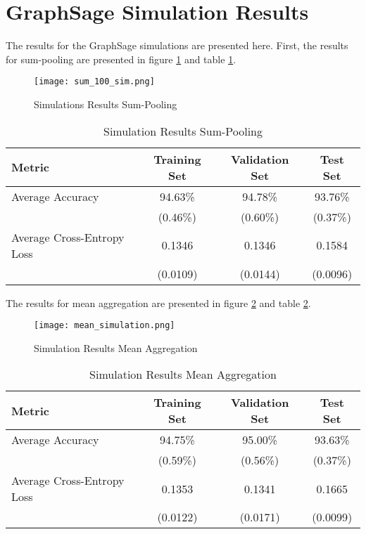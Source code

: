 
  \section[Simulations]{GraphSage Simulation Results}
  \label{App:sim_results}

  The results for the GraphSage simulations are presented here. First, the
  results for sum-pooling are presented in figure \ref{fig:sum_sim} and table
  \ref{table:sum_sim}.

  \begin{figure}[htbp!]
		\centering
		\texttt{[image: sum\_100\_sim.png]}
		\caption{Simulations Results Sum-Pooling}
        \label{fig:sum_sim}
  \end{figure}

  \begin{table}[h]
    \centering
      \begin{tabular}{|l||c|c|c|}
      \hline
      \textbf{Metric} & \textbf{Training Set} & \textbf{Validation Set} & 
      \textbf{Test Set}\\
      \hline\hline
      Average Accuracy & 94.63\% & 94.78\% & 93.76\% \\\hline 
                       & (0.46\%) & (0.60\%) & (0.37\%) \\\hline
      Average Cross-Entropy Loss & 0.1346 & 0.1346 & 0.1584 \\\hline
                                 & (0.0109) & (0.0144) & (0.0096) \\
      \hline
    \end{tabular}
    \caption{Simulation Results Sum-Pooling}
    \label{table:sum_sim}
  \end{table}

  \noindent The results for mean aggregation are presented in figure 
  \ref{fig:mean_sim} and table \ref{table:mean_sim}.

  \begin{figure}[h]
		\centering
		\texttt{[image: mean\_simulation.png]}
		\caption{Simulation Results Mean Aggregation}
        \label{fig:mean_sim}
  \end{figure}

  \begin{table}[h]
    \centering
      \begin{tabular}{|l||c|c|c|}
      \hline
      \textbf{Metric} & \textbf{Training Set} & \textbf{Validation Set} & 
      \textbf{Test Set}\\
      \hline\hline
      Average Accuracy & 94.75\% & 95.00\% & 93.63\% \\\hline 
                       & (0.59\%) & (0.56\%) & (0.37\%) \\\hline
      Average Cross-Entropy Loss & 0.1353 & 0.1341 & 0.1665 \\\hline
                                 & (0.0122) & (0.0171) & (0.0099) \\
      \hline
    \end{tabular}
    \caption{Simulation Results Mean Aggregation}
    \label{table:mean_sim}
  \end{table}

